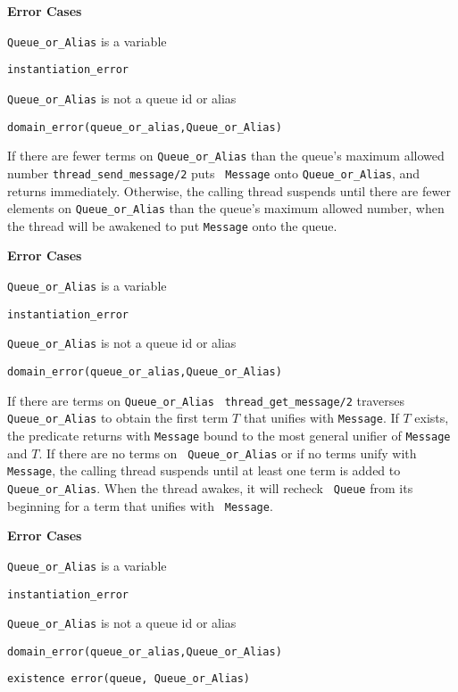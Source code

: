 \begin{description}
{\bf Error Cases}
\bi
\item 	{\tt Queue\_or\_Alias} is a variable
\bi
\item 	{\tt instantiation\_error}
\ei
%
\item 	{\tt Queue\_or\_Alias} is not a queue id or alias
\bi
\item 	{\tt domain\_error(queue\_or\_alias,Queue\_or\_Alias)}
\ei
\ei
%


%
If there are fewer terms on {\tt Queue\_or\_Alias} than the queue's
maximum allowed number {\tt thread\_send\_message/2} puts {\tt
  Message} onto {\tt Queue\_or\_Alias}, and returns immediately.
Otherwise, the calling thread suspends until there are fewer elements
on {\tt Queue\_or\_Alias} than the queue's maximum allowed number,
when the thread will be awakened to put {\tt Message} onto the queue.

{\bf Error Cases}
\bi
\item 	{\tt Queue\_or\_Alias} is a variable
\bi
\item 	{\tt instantiation\_error}
\ei
%
\item 	{\tt Queue\_or\_Alias} is not a queue id or alias
\bi
\item 	{\tt domain\_error(queue\_or\_alias,Queue\_or\_Alias)}
\ei
\ei
%

%
If there are terms on {\tt Queue\_or\_Alias} {\tt
  thread\_get\_message/2} traverses {\tt Queue\_or\_Alias} to obtain
the first term $T$ that unifies with {\tt Message}.  If $T$ exists,
the predicate returns with {\tt Message} bound to the most general
unifier of {\tt Message} and $T$.  If there are no terms on {\tt
  Queue\_or\_Alias} or if no terms unify with {\tt Message}, the
calling thread suspends until at least one term is added to {\tt
  Queue\_or\_Alias}.  When the thread awakes, it will recheck {\tt
  Queue} from its beginning for a term that unifies with {\tt
  Message}.

{\bf Error Cases}
\bi
\item 	{\tt Queue\_or\_Alias} is a variable
\bi
\item 	{\tt instantiation\_error}
\ei
%
\item 	{\tt Queue\_or\_Alias} is not a queue id or alias
\bi
\item 	{\tt domain\_error(queue\_or\_alias,Queue\_or\_Alias)}
\ei
\bi
\item   {\tt existence error(queue, Queue\_or\_Alias)}
\ei
\ei
%


\end{description}
